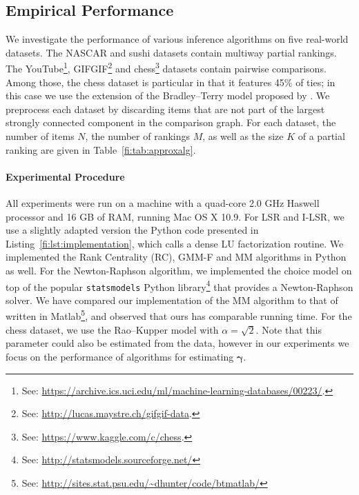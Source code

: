 \subsection{Empirical Performance}

We investigate the performance of various inference algorithms on five real-world datasets.
The NASCAR \citep{hunter2004mm} and sushi \citep{kamishima2009efficient} datasets contain multiway partial rankings.
The YouTube\footnote{%
See: \url{https://archive.ics.uci.edu/ml/machine-learning-databases/00223/}.},
GIFGIF\footnote{%
See: \url{http://lucas.maystre.ch/gifgif-data}.}
and chess\footnote{%
See: \url{https://www.kaggle.com/c/chess}.}
datasets contain pairwise comparisons.
Among those, the chess dataset is particular in that it features 45\% of ties;
in this case we use the extension of the Bradley--Terry model proposed by \citet{rao1967ties}.
We preprocess each dataset by discarding items that are not part of the largest strongly connected component in the comparison graph.
For each dataset, the number of items $N$, the number of rankings $M$, as well as the size $K$ of a partial ranking are given in Table~\ref{fi:tab:approxalg}.

\paragraph{Experimental Procedure}
All experiments were run on a machine with a quad-core 2.0 GHz Haswell processor and 16 GB of RAM, running Mac OS X 10.9.
For LSR and I-LSR, we use a slightly adapted version the Python code presented in Listing~\ref{fi:lst:implementation}, which calls a dense LU factorization routine.
We implemented the Rank Centrality (RC), GMM-F and MM \citep{hunter2004mm} algorithms in Python as well.
For the Newton-Raphson algorithm, we implemented the choice model on top of the popular \texttt{statsmodels} Python library\footnote{%
See: \url{http://statsmodels.sourceforge.net/}
} that provides a Newton-Raphson solver.
We have compared our implementation of the MM algorithm to that of \citeauthor{hunter2004mm} written in Matlab\footnote{
See: \url{http://sites.stat.psu.edu/~dhunter/code/btmatlab/}
}, and observed that ours has comparable running time.
For the chess dataset, we use the Rao--Kupper model with $\alpha = \sqrt{2}$.
Note that this parameter could also be estimated from the data, however in our experiments we focus on the performance of algorithms for estimating $\bm{\gamma}$.

